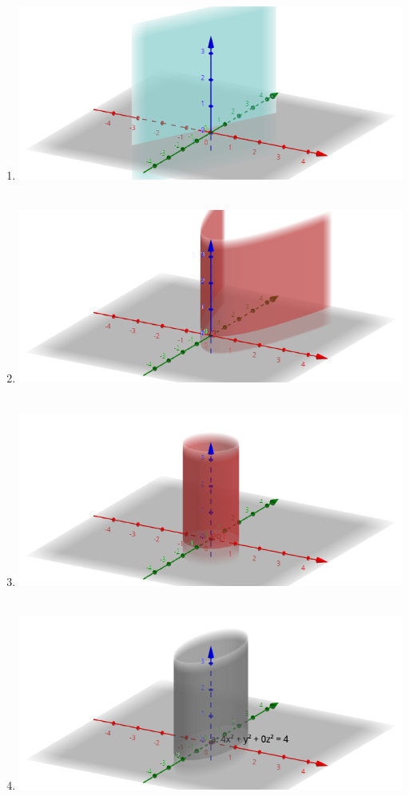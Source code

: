 \documentclass[../practica_02.tex]{subfiles}
\begin{document}
    \begin{enumerate}
        \item \includegraphics[scale=0.4]{ej06/resources/a.png} $ $
        \item \includegraphics[scale=0.4]{ej06/resources/b.png} $ $
        \item \includegraphics[scale=0.4]{ej06/resources/c.png} $ $
        \item \includegraphics[scale=0.4]{ej06/resources/d.png} $ $
    \end{enumerate}
\end{document}
